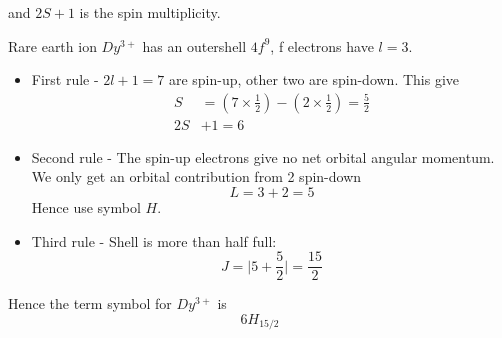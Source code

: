 \documentclass[a4paper, 11pt, normalem]{report}
\begin{document}
and $2S+1$ is the spin multiplicity. 
\begin{example}[$Du^{3+}$]
    Rare earth ion $Dy^{3+}$ has an outershell $4f^9$, f electrons have $l=3$.
    \begin{itemize}
        \item First rule - $2l+1=7$ are spin-up, other two are spin-down.
            This give
            \begin{align}
                S &= (7\times\frac12)-(2\times\frac12)=\frac52 \\
                2S &+ 1 = 6
            \end{align}
        \item Second rule - The spin-up electrons give no net orbital angular momentum. 
            We only get an orbital contribution from 2 spin-down
            \begin{equation}
                L = 3+2 = 5
            \end{equation}
            Hence use symbol $H$.
        \item Third rule - Shell is more than half full:
            \begin{equation}
                J = \big| 5 + \frac52\big| = \frac{15}{2}
            \end{equation}
    \end{itemize}
            Hence the term symbol for $Dy^{3+}$ is 
            \begin{equation*}
                6H_{15/2}
            \end{equation*}
\end{example}

\chapter{}
\end{document}
